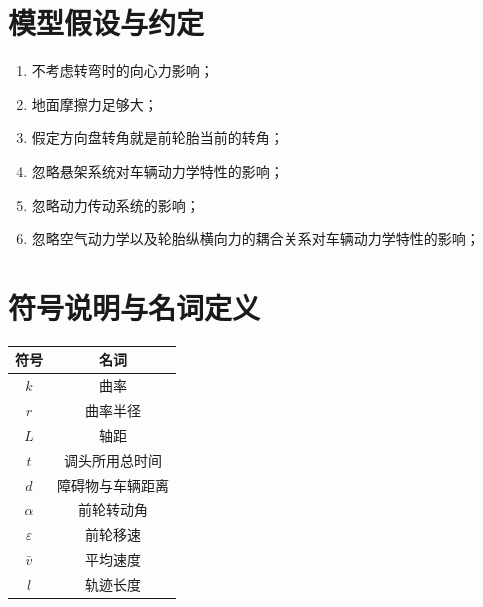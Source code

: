 \documentclass{article}
\begin{document}
\newpage                                                    %
\section{模型假设与约定}
\begin{enumerate}
    \item 不考虑转弯时的向心力影响；
    \item 地面摩擦力足够大；
    \item 假定方向盘转角就是前轮胎当前的转角；
    \item 忽略悬架系统对车辆动力学特性的影响\cite{祁志远2015三种直角坐标牛顿潮流算法的收敛性比较}；
    \item 忽略动力传动系统的影响；
    \item 忽略空气动力学以及轮胎纵横向力的耦合关系对车辆动力学特性的影响；
\end{enumerate}
\vspace{4em}
\section{符号说明与名词定义}
\vspace{4ex}                %
\begin{center}              %
    \begin{tabular}{cc}
        \toprule
        符号          & 名词             \\
        \midrule
        $k$           & 曲率             \\

        $r$           & 曲率半径         \\

        $L$           & 轴距             \\

        $t$           & 调头所用总时间   \\

        $d$           & 障碍物与车辆距离 \\

        $\alpha $     & 前轮转动角       \\

        $\varepsilon$ & 前轮移速         \\

        $\bar v$      & 平均速度         \\

        $l$           & 轨迹长度         \\
        \bottomrule
    \end{tabular}
\end{center}
\end{document}
